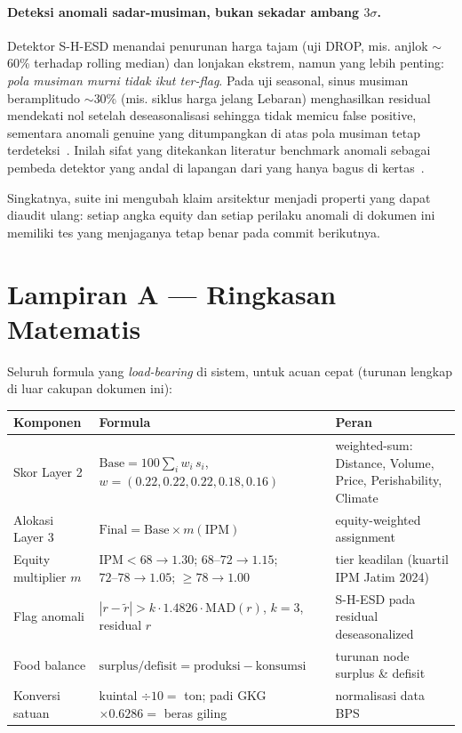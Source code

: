 \documentclass[11pt,a4paper]{article}
\begin{document}
\paragraph{Deteksi anomali sadar-musiman, bukan sekadar ambang $3\sigma$.}
Detektor S-H-ESD menandai penurunan harga tajam (uji DROP, mis. anjlok
$\sim$60\% terhadap rolling median) dan lonjakan ekstrem, namun yang lebih
penting: \emph{pola musiman murni tidak ikut ter-flag}. Pada uji seasonal,
sinus musiman beramplitudo $\sim$30\% (mis. siklus harga jelang Lebaran)
menghasilkan residual mendekati nol setelah deseasonalisasi sehingga tidak
memicu false positive, sementara anomali genuine yang ditumpangkan di atas
pola musiman tetap terdeteksi~\cite{shesd2017}. Inilah sifat yang ditekankan
literatur benchmark anomali sebagai pembeda detektor yang andal di lapangan
dari yang hanya bagus di kertas~\cite{liu2024}.

\noindent
Singkatnya, suite ini mengubah klaim arsitektur menjadi properti yang dapat
diaudit ulang: setiap angka equity dan setiap perilaku anomali di dokumen ini
memiliki tes yang menjaganya tetap benar pada commit berikutnya.

\section*{Lampiran A --- Ringkasan Matematis}
Seluruh formula yang \emph{load-bearing} di sistem, untuk acuan cepat (turunan lengkap di luar
cakupan dokumen ini):

\begin{center}
\begin{longtable}{p{3.2cm}p{6.4cm}p{4.6cm}}
\toprule
\textbf{Komponen} & \textbf{Formula} & \textbf{Peran} \\
\midrule
\endhead
Skor Layer 2 & $\text{Base} = 100\sum_i w_i\,s_i$, \; $w=(0.22,0.22,0.22,0.18,0.16)$ & weighted-sum: Distance, Volume, Price, Perishability, Climate \\
Alokasi Layer 3 & $\text{Final} = \text{Base}\times m(\text{IPM})$ & equity-weighted assignment \\
Equity multiplier $m$ & $\text{IPM}{<}68\!\rightarrow\!1.30$; $68\text{--}72\!\rightarrow\!1.15$; $72\text{--}78\!\rightarrow\!1.05$; $\geq 78\!\rightarrow\!1.00$ & tier keadilan (kuartil IPM Jatim 2024) \\
Flag anomali & $|r-\tilde{r}| > k\cdot 1.4826\cdot \mathrm{MAD}(r)$, \; $k{=}3$, residual $r$ & S-H-ESD pada residual deseasonalized \\
Food balance & $\text{surplus/defisit} = \text{produksi} - \text{konsumsi}$ & turunan node surplus \& defisit \\
Konversi satuan & kuintal $\div 10 =$ ton; \; padi GKG $\times 0.6286 =$ beras giling & normalisasi data BPS \\
\bottomrule
\end{longtable}
\end{center}
\end{document}
